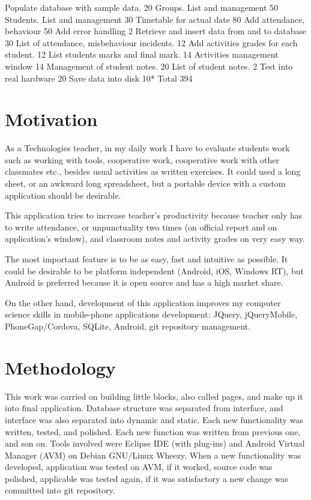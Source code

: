 	Populate database with sample data.
20
	Groups. List and management
50
	Students. List and management
30
	Timetable for actual date
80
	Add attendance, behaviour
50
	Add error handling
2
	Retrieve and insert data from and to database
30
	List of attendance, misbehaviour incidents.
12
	Add activities grades for each student.
12
	List students marks and final mark.
14
	Activities management window 
14
	Management of student notes.
20
	List of student notes. 
2
Test into real hardware
20
Save data into disk
10*
Total
394

\section {Motivation}
  As a Technologies teacher, in my daily work I have to evaluate students work such as working with tools, cooperative work, cooperative work with other classmates etc., besides usual activities as written exercises. It could used a long sheet, or an awkward long spreadsheet, but a portable device with a custom application should be desirable.
  
	This application tries to increase teacher's productivity because teacher only has to write attendance, or unpunctuality two times (on official report and on application's window), and classroom notes and activity grades on very easy way.
	
	The most important feature is to be as easy, fast and intuitive as possible. It could be desirable to be platform independent (Android, iOS, Windows RT), but Android is preferred because it is open source and has a high market share.
	
	On the other hand, development of this application improves my computer science skills in  mobile-phone applications development: JQuery,  jQueryMobile, PhoneGap/Cordova, SQLite, Android,  git repository management.

\section {Methodology}

	This work was carried on building little blocks, also called pages, and make up it into final application. Database structure was separated from interface, and interface was also separated into dynamic and static. Each new functionality was written, tested, and polished. Each new function was written from previous one, and son on.
	Tools involved were Eclipse IDE (with plug-ins) and Android Virtual Manager (AVM) on Debian GNU/Linux Wheezy. When a new functionality was developed, application was tested on AVM,  if it worked, source code was polished, applicable was tested again, if it was satisfactory a new change was committed into git repository. 
